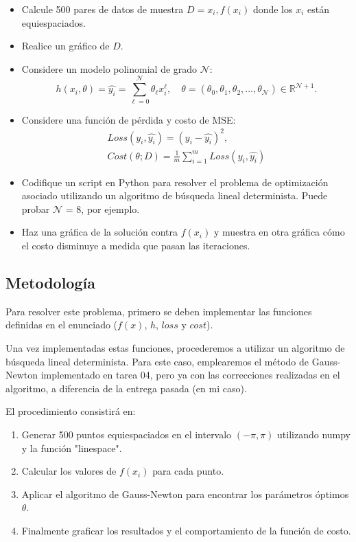 \documentclass{article}
\begin{document}
\begin{itemize}
    \item Calcule 500 pares de datos de muestra $D = {x_i,f(x_i)}$ donde los $x_i$ están equiespaciados.
    \item Realice un gráfico de $D$.
    \item Considere un modelo polinomial de grado $\mathcal{N}$:
        \begin{equation*}
            h(x_i, \theta) = \hat{y_i} = \sum^{\mathcal{N}}_{\ell=0}\theta_{\ell}x^{\ell}_{i}, \quad \theta=(\theta_{0}, \theta_{1}, \theta_{2}, ...,\theta_{\mathcal{N}}) \in \mathbb{R}^{\mathcal{N}+1}.
        \end{equation*}
    \item Considere una función de pérdida y costo de MSE:
        \begin{align*}
            Loss(y_i, \hat{y_i}) = (y_i - \hat{y_i})^2, \\
            Cost(\theta;D) = \frac{1}{m}\sum^{m}_{i=1}Loss(y_i, \hat{y_i})
        \end{align*}
    \item Codifique un script en Python para resolver el problema de optimización asociado utilizando un algoritmo de búsqueda lineal determinista. Puede probar $\mathcal{N}$ = 8, por ejemplo.
    \item Haz una gráfica de la solución contra $f(x_i)$ y muestra en otra gráfica cómo el costo disminuye a medida que pasan las iteraciones.
\end{itemize}

\subsection{Metodología}

Para resolver este problema, primero se deben implementar las funciones definidas en el enunciado ($f(x)$, $h$, $loss$ y $cost$).

Una vez implementadas estas funciones, procederemos a utilizar un algoritmo de búsqueda lineal determinista. Para este caso, emplearemos el método de Gauss-Newton implementado en tarea 04, pero ya con las correcciones realizadas en el algoritmo, a diferencia de la entrega pasada (en mi caso).

El procedimiento consistirá en:
\begin{enumerate}
    \item Generar 500 puntos equiespaciados en el intervalo $(-\pi, \pi)$ utilizando numpy y la función "linespace".
    \item Calcular los valores de $f(x_i)$ para cada punto.
    \item Aplicar el algoritmo de Gauss-Newton para encontrar los parámetros óptimos $\theta$.
    \item Finalmente graficar los resultados y el comportamiento de la función de costo.
\end{enumerate}
\end{document}
